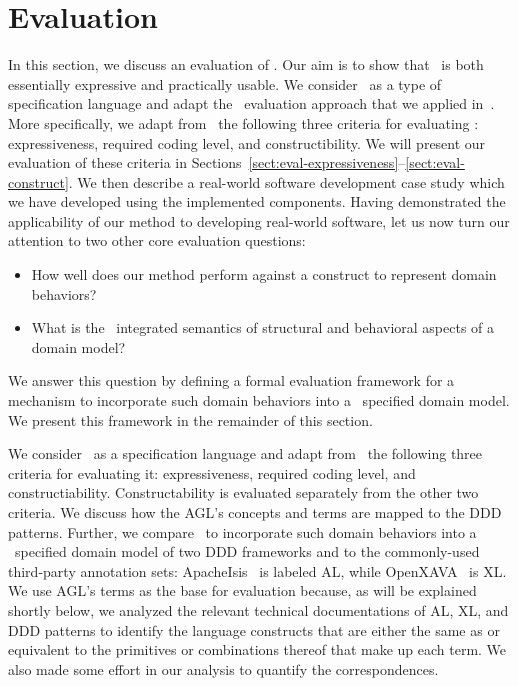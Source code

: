 \section{Evaluation}
\label{sect:evaluation} %

In this section, we discuss an evaluation of \agl. Our aim is to show that \agl~is both  essentially expressive and practically usable.
%
%
We consider \agl~as a type of specification language and adapt the \dcsl~evaluation approach that we applied in~\cite{le_domain_2018}.
%
More specifically, we adapt from~\cite{lamsweerde_formal_2000} the following three criteria for evaluating \agl: expressiveness, required coding level, and constructibility. We will present our evaluation of these criteria in Sections~\ref{sect:eval-expressiveness}--\ref{sect:eval-construct}. We then describe a real-world software development case study which we have developed using the implemented components. Having demonstrated the applicability of our method to developing real-world software, let us now turn our attention to two other core evaluation questions:
\begin{itemize}
	\item How well does our method perform against a construct to represent domain behaviors?
	\item What is the \agl~integrated semantics of structural and behavioral aspects of a domain model?
\end{itemize}
We answer this question by defining a formal evaluation framework for a mechanism to incorporate such domain behaviors into a \dcsl~specified domain model. We present this framework in the remainder of this section. 

We consider \agl~as a specification language and adapt from \cite{thakur2019role}~the following three criteria for evaluating it: expressiveness, required coding level, and constructiability. Constructability is evaluated separately from the other two criteria. We discuss how the AGL’s concepts and terms are mapped to the DDD patterns. Further, we compare \agl~to incorporate such domain behaviors into a \dcsl~specified domain model of two DDD frameworks and to the commonly-used third-party annotation sets: ApacheIsis \cite{haywood2013apache}~is labeled AL, while OpenXAVA \cite{aprende_OpenXava_2011}~is XL.
We use AGL’s terms as the base for evaluation because, as will be explained shortly below, we analyzed the relevant technical documentations of AL, XL, and DDD patterns to identify the language constructs that are either the same as or equivalent to the primitives or combinations thereof that make up each term. We also made some effort in our analysis to quantify the correspondences.

